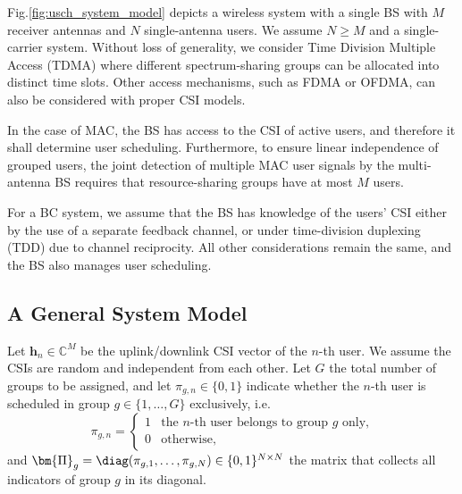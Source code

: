 Fig.\ref{fig:usch_system_model} depicts a wireless system with a single BS with $M$ receiver antennas and $N$ single-antenna users. We assume $N\ge M$ and a single-carrier system. Without loss of generality, we consider Time Division Multiple Access (TDMA) where different spectrum-sharing groups can be allocated into distinct time slots. Other access mechanisms, such as FDMA or OFDMA, can also be considered with proper CSI models.

In the case of MAC, the BS has access to the CSI of active users, and therefore it shall determine user scheduling. 
Furthermore, to ensure linear independence of grouped users, the joint detection of multiple MAC user signals by the multi-antenna BS requires that resource-sharing groups have at most $M$ users. 

For a BC system, we assume that the BS has knowledge of the users' CSI either by the use of a separate feedback channel, or under time-division duplexing (TDD) due to channel reciprocity. All other considerations remain the same, and the BS also manages user scheduling. 


\subsection{A General System Model} 

Let $\bm{h}_{n}\in \mathbb{C}^{M}$ be the uplink/downlink CSI vector of the $n$-th user. We assume the CSIs are random and independent from each other.
Let $G$ the total number of groups to be assigned, and let $\pi_{g,n}\in\{0,1\}$ indicate whether the $n$-th user is scheduled in group $g\in\{1,\ldots,G\}$ exclusively, i.e.
\begin{equation}
	{\pi _{g,n}} = \left\{ \begin{array}{ll}
		1&\text{the $n$-th user belongs to group $g$ only,}\\
		0&\text{otherwise,}
	\end{array} \right.
\end{equation}
and  $\bm{\Pi}_g=\diag(\pi_{g,1},\ldots,\pi_{g,N})\in\{0,1\}^{N\times N}$ the matrix that collects all indicators of group $g$ in its diagonal.

